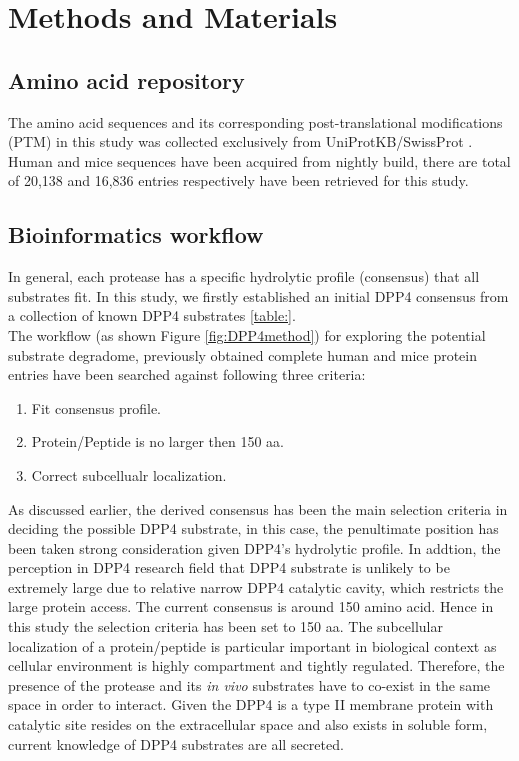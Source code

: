 \section{Methods and Materials}

\subsection{Amino acid repository}
The amino acid sequences and its corresponding post-translational modifications (PTM) in this study was collected exclusively from UniProtKB/SwissProt \cite{Magrane:2011fv}. Human and mice sequences have been acquired from nightly build, there are total of 20,138 and 16,836 entries respectively have been retrieved for this study. 
\\
\subsection{Bioinformatics workflow}
In general, each protease has a specific hydrolytic profile (consensus) that all substrates fit. In this study, we firstly established an initial DPP4 consensus from a collection of known DPP4 substrates \ref{table:}. 
\\
The workflow (as shown Figure \ref{fig:DPP4method}) for exploring the potential substrate degradome, previously obtained complete human and mice protein entries have been searched against following three criteria:
\begin{enumerate}
\item Fit consensus profile.
\item Protein/Peptide is no larger then 150 aa. 
\item Correct subcellualr localization.
\end{enumerate}

As discussed earlier, the derived consensus has been the main selection criteria in deciding the possible DPP4 substrate, in this case, the penultimate position has been taken strong consideration given DPP4's hydrolytic profile. In addtion, the perception in DPP4 research field that DPP4 substrate is unlikely to be extremely large due to relative narrow DPP4 catalytic cavity, which restricts the large protein access. The current consensus is around 150 amino acid. Hence in this study the selection criteria has been set to 150 aa. The subcellular localization of a protein/peptide is particular important in biological context as cellular environment is highly compartment and tightly regulated. Therefore, the presence of the protease and its \textit{in vivo} substrates have to co-exist in the same space in order to interact. Given the DPP4 is a type II membrane protein with catalytic site resides on the extracellular space and also exists in soluble form, current knowledge of DPP4 substrates are all secreted. 
\\
